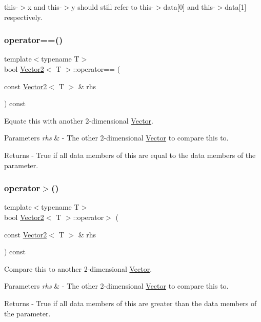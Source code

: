 this-\/$>$x and this-\/$>$y should still refer to this-\/$>$data\mbox{[}0\mbox{]} and this-\/$>$data\mbox{[}1\mbox{]} respectively. \mbox{\label{class_vector2_a45c07c01d5704a8f7e9b55077034e4f8}} 
\subsubsection{\texorpdfstring{operator==()}{operator==()}}
{\footnotesize\ttfamily template$<$typename T$>$ \\
bool \mbox{\hyperlink{class_vector2}{Vector2}}$<$ T $>$\+::operator== (\begin{DoxyParamCaption}\item[{const \mbox{\hyperlink{class_vector2}{Vector2}}$<$ T $>$ \&}]{rhs }\end{DoxyParamCaption}) const}

Equate this with another 2-\/dimensional \mbox{\hyperlink{class_vector}{Vector}}. 
\begin{DoxyParams}{Parameters}
{\em rhs} & -\/ The other 2-\/dimensional \mbox{\hyperlink{class_vector}{Vector}} to compare this to. \\
\hline
\end{DoxyParams}
\begin{DoxyReturn}{Returns}
-\/ True if all data members of this are equal to the data members of the parameter. 
\end{DoxyReturn}
\mbox{\label{class_vector2_ac550f020f264f8a8058ad3c623c60d40}} 
\subsubsection{\texorpdfstring{operator$>$()}{operator>()}}
{\footnotesize\ttfamily template$<$typename T$>$ \\
bool \mbox{\hyperlink{class_vector2}{Vector2}}$<$ T $>$\+::operator$>$ (\begin{DoxyParamCaption}\item[{const \mbox{\hyperlink{class_vector2}{Vector2}}$<$ T $>$ \&}]{rhs }\end{DoxyParamCaption}) const}

Compare this to another 2-\/dimensional \mbox{\hyperlink{class_vector}{Vector}}. 
\begin{DoxyParams}{Parameters}
{\em rhs} & -\/ The other 2-\/dimensional \mbox{\hyperlink{class_vector}{Vector}} to compare this to. \\
\hline
\end{DoxyParams}
\begin{DoxyReturn}{Returns}
-\/ True if all data members of this are greater than the data members of the parameter. 
\end{DoxyReturn}
\mbox{\label{class_vector2_aad131ea8361750d0fd577c268ed45cc6}} 
